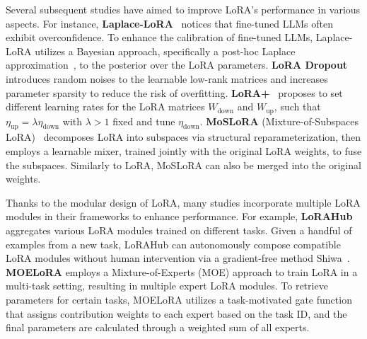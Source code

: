 Several subsequent studies have aimed to improve LoRA's performance in various aspects. For instance, \textbf{Laplace-LoRA}~\cite{yang2023bayesian} notices that fine-tuned LLMs often exhibit overconfidence. To enhance the calibration of fine-tuned LLMs, Laplace-LoRA utilizes a Bayesian approach, specifically a post-hoc Laplace approximation~\cite{mackay1992practical,antoran2022adapting}, to the posterior over the LoRA parameters. 
\textbf{LoRA Dropout}~\cite{lin2024lora} introduces random noises to the learnable low-rank matrices and increases parameter sparsity to reduce the risk of overfitting.
\textbf{LoRA+}~\cite{hayou2024lora+} proposes to set different learning rates for the LoRA matrices $W_{\text{down}}$ and $W_{\text{up}}$, such that $\eta_\text{up} = \lambda \eta_\text{down}$ with $\lambda > 1$ fixed and tune $\eta_\text{down}$.
\textbf{MoSLoRA} (Mixture-of-Subspaces LoRA)~\cite{wu2024mixturemos} decomposes LoRA into subspaces via structural reparameterization, then employs a learnable mixer, trained jointly with the original LoRA weights, to fuse the subspaces. Similarly to LoRA, MoSLoRA can also be merged into the original weights.

Thanks to the modular design of LoRA, many studies incorporate multiple LoRA modules in their frameworks to enhance performance.
For example, \textbf{LoRAHub} aggregates various LoRA modules trained on different tasks. Given a handful of examples from a new task, LoRAHub can autonomously compose compatible LoRA modules without human intervention via a gradient-free method Shiwa~\cite{liu2020versatile}. \textbf{MOELoRA} employs a Mixture-of-Experts (MOE) approach to train LoRA in a multi-task setting, resulting in multiple expert LoRA modules. To retrieve parameters for certain tasks, MOELoRA utilizes a task-motivated gate function that assigns contribution weights to each expert based on the task ID, and the final parameters are calculated through a weighted sum of all experts. 

